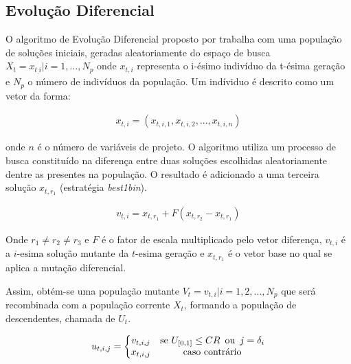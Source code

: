 \documentclass{article}
\begin{document}
\subsection{Evolução Diferencial}
O algoritmo de Evolução Diferencial proposto por \cite{storn1997differential} trabalha com uma população de
soluções iniciais, geradas aleatoriamente do espaço de busca $X_t = {x_{t_,i} | i = 1, ... , N_p}$ onde $x_{t,i}$ representa o i-ésimo indivíduo da t-ésima geração e $N_p$ o número de indivíduos da população. Um indíviduo é descrito como um vetor da forma:

\begin{equation}
\begin{split}
x_{t,i} = (x_{t,i,1}, x_{t,i,2}, ..., x_{t,i,n}) 
\end{split}
\end{equation}

onde $n$ é o número de variáveis de projeto. O algoritmo utiliza um processo de busca constituído na diferença entre duas soluções escolhidas aleatoriamente dentre as presentes na população. O
resultado é adicionado a uma terceira solução $x_{t,r_1}$ (estratégia \textit{best1bin}).


\begin{equation}
\begin{split}
v_{t,i} = x_{t,r_1} + F(x_{t,r_2} - x_{t,r_1})
\end{split}
\end{equation}

Onde $r_1 \neq r_2 \neq r_3$ e $F$ é o fator de escala multiplicado pelo
vetor diferença, $v_{t,i}$ é a $i\text{-esima}$ solução mutante da $t\text{-esima}$ geração e $x_{t,r_1}$ é o
vetor base no qual se aplica a mutação diferencial.\newline

Assim, obtém-se uma população mutante $V_{t} = {v_{t,i} | i = 1, 2, ..., N_p}$ que será recombinada com a população corrente $X_t$, formando a população de descendentes, chamada de $U_t$. 

\begin{equation}
\begin{split}
u_{t,i,j} = 
\left\{\begin{matrix}
v_{t,i,j} & \text{se } U_{[0,1]} \leq CR \text{\phantom{0}ou\phantom{0}} j = \delta_i \\
x_{t,i,j} & \text{caso contrário}
\end{matrix}\right.
\end{split}
\end{equation}
\end{document}
